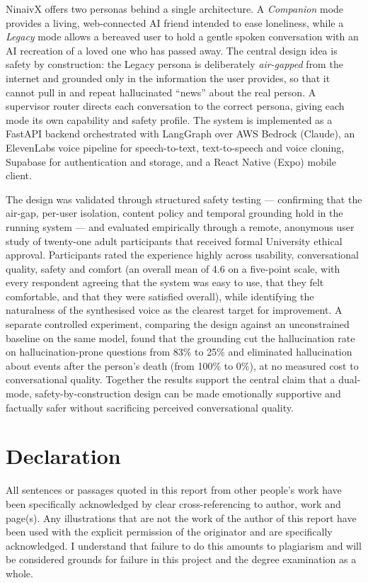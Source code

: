 \documentclass[11pt,a4paper]{report}
\begin{document}
NinaivX offers two personas behind a single architecture. A \emph{Companion} mode provides a living, web-connected AI friend intended to ease loneliness, while a \emph{Legacy} mode allows a bereaved user to hold a gentle spoken conversation with an AI recreation of a loved one who has passed away. The central design idea is safety by construction: the Legacy persona is deliberately \emph{air-gapped} from the internet and grounded only in the information the user provides, so that it cannot pull in and repeat hallucinated ``news'' about the real person. A supervisor router directs each conversation to the correct persona, giving each mode its own capability and safety profile. The system is implemented as a FastAPI backend orchestrated with LangGraph over AWS Bedrock (Claude), an ElevenLabs voice pipeline for speech-to-text, text-to-speech and voice cloning, Supabase for authentication and storage, and a React Native (Expo) mobile client.

The design was validated through structured safety testing --- confirming that the air-gap, per-user isolation, content policy and temporal grounding hold in the running system --- and evaluated empirically through a remote, anonymous user study of twenty-one adult participants that received formal University ethical approval. Participants rated the experience highly across usability, conversational quality, safety and comfort (an overall mean of 4.6 on a five-point scale, with every respondent agreeing that the system was easy to use, that they felt comfortable, and that they were satisfied overall), while identifying the naturalness of the synthesised voice as the clearest target for improvement. A separate controlled experiment, comparing the design against an unconstrained baseline on the same model, found that the grounding cut the hallucination rate on hallucination-prone questions from 83\% to 25\% and eliminated hallucination about events after the person's death (from 100\% to 0\%), at no measured cost to conversational quality. Together the results support the central claim that a dual-mode, safety-by-construction design can be made emotionally supportive and factually safer without sacrificing perceived conversational quality.

\chapter*{Declaration}
All sentences or passages quoted in this report from other people's work have been specifically acknowledged by clear cross-referencing to author, work and page(s). Any illustrations that are not the work of the author of this report have been used with the explicit permission of the originator and are specifically acknowledged. I understand that failure to do this amounts to plagiarism and will be considered grounds for failure in this project and the degree examination as a whole.
\vspace{1.5cm}
\end{document}
